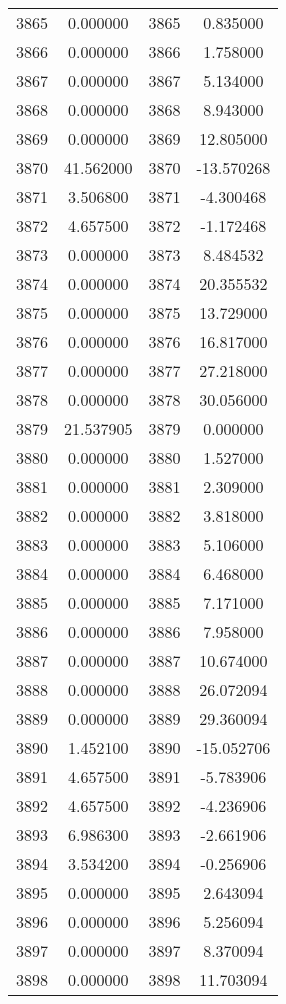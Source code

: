 \documentclass[12pt]{article}
\begin{document}
\begin{longtable}{@{}cccc@{}}
3865 & 0.000000 & 3865 & 0.835000 \\
3866 & 0.000000 & 3866 & 1.758000 \\
3867 & 0.000000 & 3867 & 5.134000 \\
3868 & 0.000000 & 3868 & 8.943000 \\
3869 & 0.000000 & 3869 & 12.805000 \\
3870 & 41.562000 & 3870 & -13.570268 \\
3871 & 3.506800 & 3871 & -4.300468 \\
3872 & 4.657500 & 3872 & -1.172468 \\
3873 & 0.000000 & 3873 & 8.484532 \\
3874 & 0.000000 & 3874 & 20.355532 \\
3875 & 0.000000 & 3875 & 13.729000 \\
3876 & 0.000000 & 3876 & 16.817000 \\
3877 & 0.000000 & 3877 & 27.218000 \\
3878 & 0.000000 & 3878 & 30.056000 \\
3879 & 21.537905 & 3879 & 0.000000 \\
3880 & 0.000000 & 3880 & 1.527000 \\
3881 & 0.000000 & 3881 & 2.309000 \\
3882 & 0.000000 & 3882 & 3.818000 \\
3883 & 0.000000 & 3883 & 5.106000 \\
3884 & 0.000000 & 3884 & 6.468000 \\
3885 & 0.000000 & 3885 & 7.171000 \\
3886 & 0.000000 & 3886 & 7.958000 \\
3887 & 0.000000 & 3887 & 10.674000 \\
3888 & 0.000000 & 3888 & 26.072094 \\
3889 & 0.000000 & 3889 & 29.360094 \\
3890 & 1.452100 & 3890 & -15.052706 \\
3891 & 4.657500 & 3891 & -5.783906 \\
3892 & 4.657500 & 3892 & -4.236906 \\
3893 & 6.986300 & 3893 & -2.661906 \\
3894 & 3.534200 & 3894 & -0.256906 \\
3895 & 0.000000 & 3895 & 2.643094 \\
3896 & 0.000000 & 3896 & 5.256094 \\
3897 & 0.000000 & 3897 & 8.370094 \\
3898 & 0.000000 & 3898 & 11.703094 \\

\end{longtable}
\end{document}

